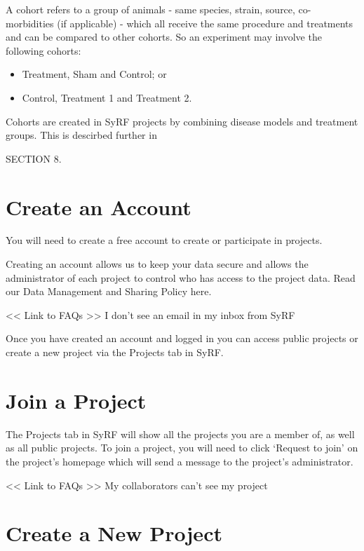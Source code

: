 \documentclass[
]{book}
\providecommand{\tightlist}{%
  \setlength{\itemsep}{0pt}\setlength{\parskip}{0pt}}
\begin{document}
A cohort refers to a group of animals - same species, strain, source, co-morbidities (if applicable) - which all receive the same procedure and treatments and can be compared to other cohorts. So an experiment may involve the following cohorts:

\begin{itemize}
\tightlist
\item
  Treatment, Sham and Control; or
\item
  Control, Treatment 1 and Treatment 2.
\end{itemize}

Cohorts are created in SyRF projects by combining disease models and treatment groups. This is descirbed further in

SECTION 8.

\hypertarget{createAccount}{%
\chapter{Create an Account}\label{createAccount}}

You will need to create a free account to create or participate in projects.

Creating an account allows us to keep your data secure and allows the administrator of each project to control who has access to the project data. Read our Data Management and Sharing Policy here.

\textless{}\textless{} Link to FAQs \textgreater{}\textgreater{}
I don't see an email in my inbox from SyRF

Once you have created an account and logged in you can access public projects or create a new project via the Projects tab in SyRF.

\hypertarget{join}{%
\chapter{Join a Project}\label{join}}

The Projects tab in SyRF will show all the projects you are a member of, as well as all public projects. To join a project, you will need to click `Request to join' on the project's homepage which will send a message to the project's administrator.

\textless{}\textless{} Link to FAQs \textgreater{}\textgreater{}
My collaborators can't see my project

\hypertarget{createProject}{%
\chapter{Create a New Project}\label{createProject}}
\end{document}
